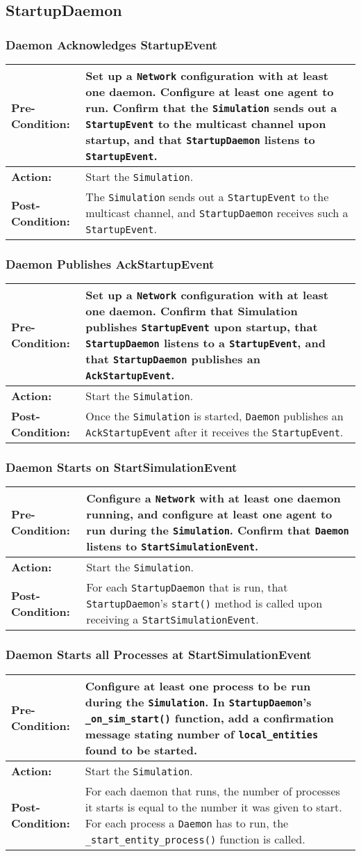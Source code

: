 \documentclass[titlepage]{article}
\newcommand{\testcase}[3]{
    \begin{center}
    \begin{tabular}{| l | p{0.7\textwidth}|}
        \hline
        \rowcolor[gray]{0.8}\textbf{Pre-Condition:} & #1 \\ \hline
        \textbf{Action:} & #2 \\ \hline
        \rowcolor[gray]{0.8}\textbf{Post-Condition:} & #3 \\ \hline
    \end{tabular}
    \end{center}
}
\begin{document}
\subsection{StartupDaemon}
\subsubsection{Daemon Acknowledges StartupEvent}
\testcase{Set up a \texttt{Network} configuration with at least one daemon.  Configure at least one agent to run.  Confirm that the \texttt{Simulation} sends out a \texttt{StartupEvent} to the multicast channel upon startup, and that \texttt{StartupDaemon} listens to \texttt{StartupEvent}.}{Start the \texttt{Simulation}.}{The \texttt{Simulation} sends out a \texttt{StartupEvent} to the multicast channel, and \texttt{StartupDaemon} receives such a \texttt{StartupEvent}.}

\subsubsection{Daemon Publishes AckStartupEvent}
\testcase{Set up a \texttt{Network} configuration with at least one daemon.  Confirm that Simulation publishes \texttt{StartupEvent} upon startup, that \texttt{StartupDaemon} listens to a \texttt{StartupEvent}, and that \texttt{StartupDaemon} publishes an \texttt{AckStartupEvent}.}{Start the \texttt{Simulation}.}{Once the \texttt{Simulation} is started, \texttt{Daemon} publishes an \texttt{AckStartupEvent} after it receives the \texttt{StartupEvent}.}

\subsubsection{Daemon Starts on StartSimulationEvent}
\testcase{Configure a \texttt{Network} with at least one daemon running, and configure at least one agent to run during the \texttt{Simulation}.  Confirm that \texttt{Daemon} listens to \texttt{StartSimulationEvent}.}{Start the \texttt{Simulation}.}{For each \texttt{StartupDaemon} that is run, that \texttt{StartupDaemon}'s \texttt{start()} method is called upon receiving a \texttt{StartSimulationEvent}.}

\subsubsection{Daemon Starts all Processes at StartSimulationEvent}
\testcase{Configure at least one process to be run during the \texttt{Simulation}.  In \texttt{StartupDaemon}'s \texttt{\_on\_sim\_start()} function, add a confirmation message stating number of \texttt{local\_entities} found to be started.}{Start the \texttt{Simulation}.}{For each daemon that runs, the number of processes it starts is equal to the number it was given to start.  For each process a \texttt{Daemon} has to run, the \texttt{\_start\_entity\_process()} function is called.}
\end{document}
